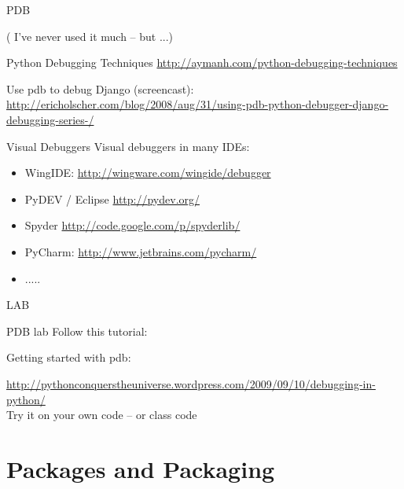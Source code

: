 \documentclass{beamer}
\begin{document}
\begin{frame}[fragile]{PDB}

( I've never used it much -- but ...)

\vfill
{\Large Python Debugging Techniques}
\url{http://aymanh.com/python-debugging-techniques}

\vfill
{\Large Use pdb to debug Django (screencast):}
\url{http://ericholscher.com/blog/2008/aug/31/using-pdb-python-debugger-django-debugging-series-/}
\end{frame} 

\begin{frame}[fragile]{Visual Debuggers}
\vfill
{\Large Visual debuggers in many IDEs:}
\begin{itemize}
  \item WingIDE: \url{http://wingware.com/wingide/debugger}
  \item PyDEV / Eclipse \url{http://pydev.org/} 
  \item Spyder \url{http://code.google.com/p/spyderlib/}
  \item PyCharm: \url{http://www.jetbrains.com/pycharm/} 
  \item .....
\end{itemize}


\end{frame} 




\begin{frame}{LAB}

{\LARGE PDB lab}
\vfill
{\Large Follow this tutorial:}

\vfill
{\Large Getting started with pdb:}

\url{http://pythonconquerstheuniverse.wordpress.com/2009/09/10/debugging-in-python/}\\

\vfill
{\Large Try it on your own code -- or class code}

\vfill
\end{frame}


\section{Packages and Packaging}
\end{document}

